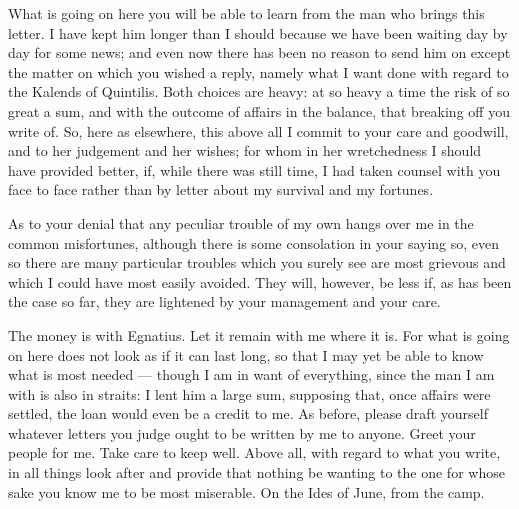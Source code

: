 

 What is going on here you will be able to learn from the man who brings this letter. I have kept him longer than I should because we have been waiting day by day for some news; and even now there has been no reason to send him on except the matter on which you wished a reply, namely what I want done with regard to the Kalends of Quintilis. Both choices are heavy: at so heavy a time the risk of so great a sum, and with the outcome of affairs in the balance, that breaking off you write of. So, here as elsewhere, this above all I commit to your care and goodwill, and to her judgement and her wishes; for whom in her wretchedness I should have provided better, if, while there was still time, I had taken counsel with you face to face rather than by letter about my survival and my fortunes.

 As to your denial that any peculiar trouble of my own hangs over me in the common misfortunes, although there is some consolation in your saying so, even so there are many particular troubles which you surely see are most grievous and which I could have most easily avoided. They will, however, be less if, as has been the case so far, they are lightened by your management and your care.

 The money is with Egnatius. Let it remain with me where it is. For what is going on here does not look as if it can last long, so that I may yet be able to know what is most needed --- though I am in want of everything, since the man I am with is also in straits: I lent him a large sum, supposing that, once affairs were settled, the loan would even be a credit to me. As before, please draft yourself whatever letters you judge ought to be written by me to anyone. Greet your people for me. Take care to keep well. Above all, with regard to what you write, in all things look after and provide that nothing be wanting to the one for whose sake you know me to be most miserable. On the Ides of June, from the camp.
